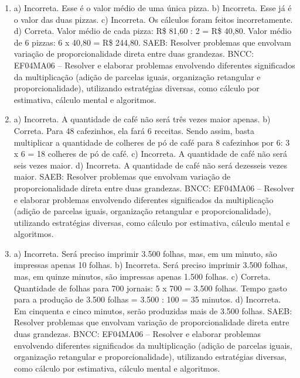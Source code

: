 \begin{enumerate}
\item
a)  Incorreta. Esse é o valor médio de uma única pizza.
b)  Incorreta. Esse já é o valor das duas pizzas.
c)  Incorreta. Os cálculos foram feitos incorretamente.
d)  Correta.  Valor médio de cada pizza: R\$ 81,60 : 2 = R\$ 40,80. Valor médio de 6 pizzas: 6 x 40,80 = R\$ 244,80.
SAEB: Resolver problemas que envolvam variação de proporcionalidade direta entre duas grandezas.
BNCC: EF04MA06 -- Resolver e elaborar problemas envolvendo diferentes significados da multiplicação
(adição de parcelas iguais, organização retangular e proporcionalidade), utilizando estratégias
diversas, como cálculo por estimativa, cálculo mental e algoritmos.

\item
a) Incorreta. A quantidade de café não será três vezes maior apenas.
b) Correta. Para 48 cafezinhos, ela fará 6 receitas. Sendo assim, basta
multiplicar a quantidade de colheres de pó de café para 8 cafezinhos por
6: 3 x 6 = 18 colheres de pó de café.
c) Incorreta. A quantidade de café não será seis vezes maior.
d) Incorreta. A quantidade de café não será dezesseis vezes maior.
SAEB: Resolver problemas que envolvam variação de proporcionalidade direta entre duas grandezas.
BNCC: EF04MA06 -- Resolver e elaborar problemas envolvendo diferentes significados da multiplicação
(adição de parcelas iguais, organização retangular e proporcionalidade), utilizando estratégias
diversas, como cálculo por estimativa, cálculo mental e algoritmos.

\item
a) Incorreta. Será preciso imprimir 3.500 folhas, mas, em um minuto, são impressas apenas 10 folhas.
b) Incorreta. Será preciso imprimir 3.500 folhas, mas, em quinze minutos, são impressas apenas 1.500 folhas.
c) Correta. Quantidade de folhas para 700 jornais: 5 x 700 = 3.500 folhas.
Tempo gasto para a produção de 3.500 folhas = 3.500 : 100 = 35 minutos.
d) Incorreta. Em cinquenta e cinco minutos, serão produzidas mais de 3.500 folhas.
SAEB: Resolver problemas que envolvam variação de proporcionalidade direta entre duas grandezas.
BNCC: EF04MA06 -- Resolver e elaborar problemas envolvendo diferentes significados da multiplicação
(adição de parcelas iguais, organização retangular e proporcionalidade), utilizando estratégias
diversas, como cálculo por estimativa, cálculo mental e algoritmos.
\end{enumerate}


